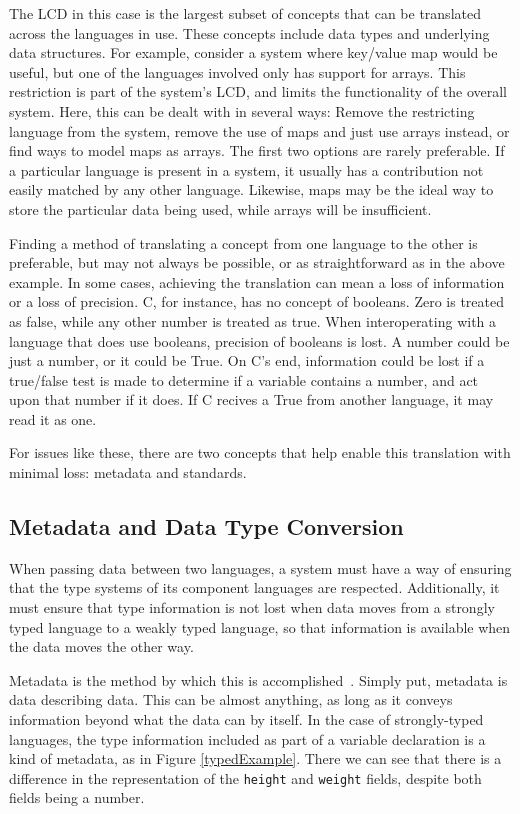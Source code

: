 \documentclass{sig-alternate}
\begin{document}
The LCD in this case is the largest subset of concepts that can be translated across the languages in use. These concepts include data types and underlying data structures.
For example, consider a system where key/value map would be useful, but one of the languages involved only has support for arrays. This restriction is part of the system's LCD, and limits the functionality of the overall system. Here, this can be dealt with in several ways: Remove the restricting language from the system, remove the use of maps and just use arrays instead, or find ways to model maps as arrays. The first two options are rarely preferable. If a particular language is present in a system, it usually has a contribution not easily matched by any other language. Likewise, maps may be the ideal way to store the particular data being used, while arrays will be insufficient.

Finding a method of translating a concept from one language to the other is preferable, but may not always be possible, or as straightforward as in the above example. In some cases, achieving the translation can mean a loss of information or a loss of precision. C, for instance, has no concept of booleans. Zero is treated as false, while any other number is treated as true. When interoperating with a language that does use booleans, precision of booleans is lost. A number could be just a number, or it could be True. On C's end, information could be lost if a true/false test is made to determine if a variable contains a number, and act upon that number if it does. If C recives a True from another language, it may read it as one.

For issues like these, there are two concepts that help enable this translation with minimal loss: metadata and standards.
\subsection{Metadata and Data Type Conversion}\label{metadata}
When passing data between two languages, a system must have a way of ensuring that the type systems of its component languages are respected. Additionally, it must ensure that type information is not lost when data moves from a strongly typed language to a weakly typed language, so that information is available when the data moves the other way.

Metadata is the method by which this is accomplished~\cite{Ide:2010}. Simply put, metadata is data describing data.
This can be almost anything, as long as it conveys information beyond what the data can by itself. In the case of strongly-typed languages, the type information included as part of a variable declaration is a kind of metadata, as in Figure \ref{typedExample}. There we can see that there is a difference in the representation of the {\tt height} and {\tt weight} fields, despite both fields being a number.
\end{document}
